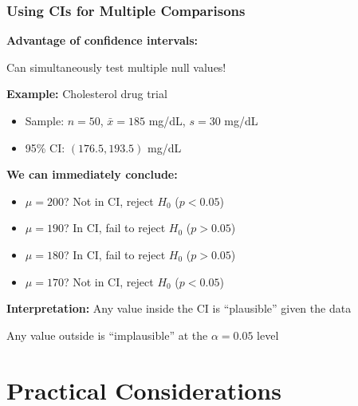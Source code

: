 \documentclass{beamer}
\begin{document}
\begin{frame}
\frametitle{Using CIs for Multiple Comparisons}
\textbf{Advantage of confidence intervals:}

\vspace{0.3cm}
Can simultaneously test multiple null values!

\vspace{0.5cm}
\textbf{Example:} Cholesterol drug trial
\begin{itemize}
\item Sample: $n = 50$, $\bar{x} = 185$ mg/dL, $s = 30$ mg/dL
\item 95\% CI: $(176.5, 193.5)$ mg/dL
\end{itemize}

\vspace{0.5cm}
\textbf{We can immediately conclude:}
\begin{itemize}
\item $\mu = 200$? Not in CI, reject $H_0$ ($p < 0.05$)
\item $\mu = 190$? In CI, fail to reject $H_0$ ($p > 0.05$)
\item $\mu = 180$? In CI, fail to reject $H_0$ ($p > 0.05$)
\item $\mu = 170$? Not in CI, reject $H_0$ ($p < 0.05$)
\end{itemize}

\vspace{0.5cm}
\textbf{Interpretation:} Any value inside the CI is ``plausible'' given the data

Any value outside is ``implausible'' at the $\alpha = 0.05$ level
\end{frame}

\section{Practical Considerations}
\end{document}
